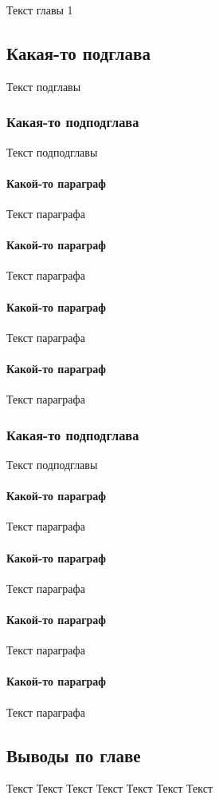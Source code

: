 Текст главы 1
\subsection{Какая-то подглава}
    Текст подглавы
    \subsubsection{Какая-то подподглава}
        Текст подподглавы
        \paragraph{Какой-то параграф}
            Текст  параграфа
        \paragraph{Какой-то параграф}
            Текст  параграфа
        \paragraph{Какой-то параграф}
            Текст  параграфа
        \paragraph{Какой-то параграф}
            Текст  параграфа
    \subsubsection{Какая-то подподглава}
        Текст подподглавы
        \paragraph{Какой-то параграф}
            Текст  параграфа
        \paragraph{Какой-то параграф}
            Текст  параграфа
        \paragraph{Какой-то параграф}
            Текст  параграфа
        \paragraph{Какой-то параграф}
            Текст  параграфа

\subsection*{Выводы по главе}
Текст Текст Текст Текст Текст Текст Текст
